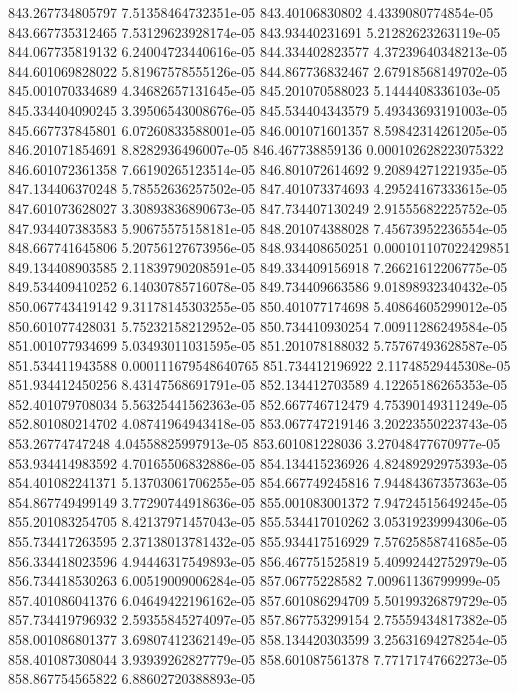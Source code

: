 {843.267734805797 7.51358464732351e-05
843.40106830802 4.4339080774854e-05
843.667735312465 7.53129623928174e-05
843.93440231691 5.21282623263119e-05
844.067735819132 6.24004723440616e-05
844.334402823577 4.37239640348213e-05
844.601069828022 5.81967578555126e-05
844.867736832467 2.67918568149702e-05
845.001070334689 4.34682657131645e-05
845.201070588023 5.1444408336103e-05
845.334404090245 3.39506543008676e-05
845.534404343579 5.49343693191003e-05
845.667737845801 6.07260833588001e-05
846.001071601357 8.59842314261205e-05
846.201071854691 8.8282936496007e-05
846.467738859136 0.000102628223075322
846.601072361358 7.66190265123514e-05
846.801072614692 9.20894271221935e-05
847.134406370248 5.78552636257502e-05
847.401073374693 4.29524167333615e-05
847.601073628027 3.30893836890673e-05
847.734407130249 2.91555682225752e-05
847.934407383583 5.90675575158181e-05
848.201074388028 7.45673952236554e-05
848.667741645806 5.20756127673956e-05
848.934408650251 0.000101107022429851
849.134408903585 2.11839790208591e-05
849.334409156918 7.26621612206775e-05
849.534409410252 6.14030785716078e-05
849.734409663586 9.01898932340432e-05
850.067743419142 9.31178145303255e-05
850.401077174698 5.40864605299012e-05
850.601077428031 5.75232158212952e-05
850.734410930254 7.00911286249584e-05
851.001077934699 5.03493011031595e-05
851.201078188032 5.75767493628587e-05
851.534411943588 0.000111679548640765
851.734412196922 2.11748529445308e-05
851.934412450256 8.43147568691791e-05
852.134412703589 4.12265186265353e-05
852.401079708034 5.56325441562363e-05
852.667746712479 4.75390149311249e-05
852.801080214702 4.08741964943418e-05
853.067747219146 3.20223550223743e-05
853.26774747248 4.04558825997913e-05
853.601081228036 3.27048477670977e-05
853.934414983592 4.70165506832886e-05
854.134415236926 4.82489292975393e-05
854.401082241371 5.13703061706255e-05
854.667749245816 7.94484367357363e-05
854.867749499149 3.77290744918636e-05
855.001083001372 7.94724515649245e-05
855.201083254705 8.42137971457043e-05
855.534417010262 3.05319239994306e-05
855.734417263595 2.37138013781432e-05
855.934417516929 7.57625858741685e-05
856.334418023596 4.94446317549893e-05
856.467751525819 5.40992442752979e-05
856.734418530263 6.00519009006284e-05
857.06775228582 7.00961136799999e-05
857.401086041376 6.04649422196162e-05
857.601086294709 5.50199326879729e-05
857.734419796932 2.59355845274097e-05
857.867753299154 2.75559434817382e-05
858.001086801377 3.69807412362149e-05
858.134420303599 3.25631694278254e-05
858.401087308044 3.93939262827779e-05
858.601087561378 7.77171747662273e-05
858.867754565822 6.88602720388893e-05
}

